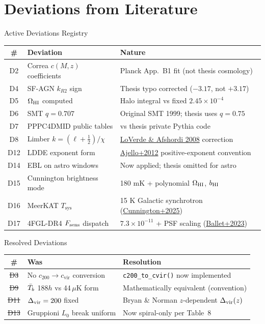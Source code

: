 \section{Deviations from Literature}

\begin{frame}{Active Deviations Registry}
\begin{table}\centering\scriptsize
\begin{tabular}{clp{6.5cm}}
\toprule
\# & Deviation & Nature \\
\midrule
D2 & Correa $c(M,z)$ coefficients & Planck App.~B1 fit (not thesis cosmology) \\
D4 & SF-AGN $k_{R2}$ sign & Thesis typo corrected ($-3.17$, not $+3.17$) \\
D5 & $\Omega_{\mathrm{HI}}$ computed & Halo integral vs fixed $2.45\times10^{-4}$ \\
D6 & SMT $q = 0.707$ & Original SMT 1999; thesis uses $q = 0.75$ \\
D7 & PPPC4DMID public tables & vs thesis private Pythia code \\
D8 & Limber $k = (\ell{+}\tfrac{1}{2})/\chi$ & \href{https://arxiv.org/abs/0809.5112}{LoVerde \& Afshordi 2008} correction \\
D12 & LDDE exponent form & \href{https://arxiv.org/abs/1110.3787}{Ajello+2012} positive-exponent convention \\
D14 & EBL on astro windows & Now applied; thesis omitted for astro \\
D15 & Cunnington brightness mode & 180 mK + polynomial $\Omega_{\mathrm{HI}}$, $b_{\mathrm{HI}}$ \\
D16 & MeerKAT $T_{\mathrm{sys}}$ & 15 K Galactic synchrotron (\href{https://arxiv.org/abs/2510.27549}{Cunnington+2025}) \\
D17 & 4FGL-DR4 $F_{\mathrm{sens}}$ dispatch & $7.3{\times}10^{-11}$ + PSF scaling (\href{https://arxiv.org/abs/2307.12546}{Ballet+2023}) \\
\bottomrule
\end{tabular}
\end{table}
\end{frame}

\begin{frame}{Resolved Deviations}
\begin{table}\centering\footnotesize
\begin{tabular}{clp{7cm}}
\toprule
\# & Was & Resolution \\
\midrule
\sout{D3} & No $c_{200}\to c_{\mathrm{vir}}$ conversion & \texttt{c200\_to\_cvir()} now implemented \\
\sout{D9} & $\bar{T}_b$ 188$h$ vs 44\,$\mu$K form & Mathematically equivalent (convention) \\
\sout{D11} & $\Delta_{\mathrm{vir}} = 200$ fixed & Bryan \& Norman $z$-dependent $\Delta_{\mathrm{vir}}(z)$ \\
\sout{D13} & Gruppioni $L_0$ break uniform & Now spiral-only per Table~8 \\
\bottomrule
\end{tabular}
\end{table}
\end{frame}

